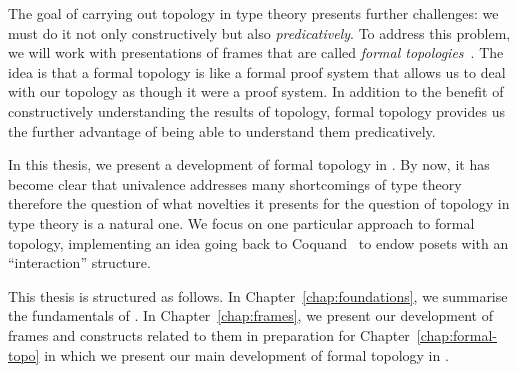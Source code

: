 The goal of carrying out topology in type theory presents further challenges: we must do
it not only constructively but also \emph{predicatively}. To address this problem, we will
work with presentations of frames that are called \emph{formal
topologies}~\cite{int-formal-spaces}. The idea is that a formal topology is like a
formal proof system that allows us to deal with our topology as though it were a proof
system. In addition to the benefit of constructively understanding the results of
topology, formal topology provides us the further advantage of being able to understand
them predicatively.

In this thesis, we present a development of formal topology in \UF{}. By now, it has
become clear that univalence addresses many shortcomings of type theory therefore the
question of what novelties it presents for the question of topology in type theory is a
natural one. We focus on one particular approach to formal topology, implementing an idea
going back to Coquand~\cite{coq-posets} to endow posets with an ``interaction'' structure.

This thesis is structured as follows. In Chapter~\ref{chap:foundations}, we summarise the
fundamentals of \UF{}. In Chapter~\ref{chap:frames}, we present our development of frames
and constructs related to them in preparation for Chapter~\ref{chap:formal-topo} in which
we present our main development of formal topology in \UF{}.
